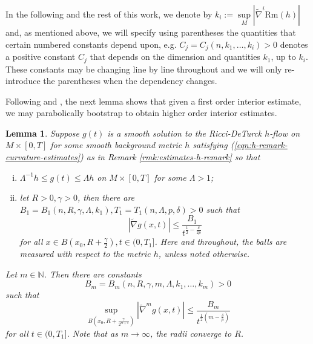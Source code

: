\documentclass[12pt]{amsart}
\theoremstyle{plain}
\theoremstyle{plain}
\newtheorem{lemma}[subsection]{Lemma}
\theoremstyle{definition}
\theoremstyle{remark}
\numberwithin{equation}{subsection}
\newcommand{\hdel}{\tilde{\nabla}}
\begin{document}
In the following and the rest of this work, we denote by $k_i := \sup\limits_M|\hdel^i\text{Rm}(h)|$ and, as mentioned above, we will specify using parentheses the quantities that certain numbered constants depend upon, e.g. $C_j = C_j(n,k_1,\dots,k_i) > 0$ denotes a positive constant $C_j$ that depends on the dimension and quantities $k_1$, up to $k_i$. These constants may be changing line by line throughout and we will only re-introduce the parentheses when the dependency changes.

Following \cite{shi_deforming_1989} and \cite{simon_deformation_2002}, the next lemma shows that given a first order interior estimate, we may parabolically bootstrap to obtain higher order interior estimates.

\begin{lemma}\label{lem:estimates-bootstrap}
    Suppose $g(t)$ is a smooth solution to the Ricci-DeTurck $h$-flow on $M \times [0,T]$ for some smooth background metric $h$ satisfying (\ref{eqn:h-remark-curvature-estimates}) as in Remark \ref{rmk:estimates-h-remark} so that
    \begin{enumerate}[(i)]
        \item $\Lambda^{-1}h \leq g(t) \leq \Lambda h$ on $M\times[0,T]$ for some $\Lambda > 1$;
        \item let $R > 0, \gamma > 0$, then there are $B_1 = B_1(n,R,\gamma,\Lambda,k_1), T_1 = T_1(n,\Lambda,p,\delta) > 0$ such that
        \begin{equation*}
            |\hdel g(x,t)| \leq \frac{B_1}{t^{\frac{1}{2}-\frac{\delta}{2p}}}
        \end{equation*}
        for all $x \in B\left(x_0, R + \frac{\gamma}{2}\right), t \in (0, T_1]$. Here and throughout, the balls are measured with respect to the metric $h$, unless noted otherwise.
    \end{enumerate}
    Let $m \in \mathbb{N}$. Then there are constants 
    \begin{equation*}
        B_m = B_m(n,R,\gamma, m,\Lambda,k_1,\dots,k_m) > 0
    \end{equation*}
    such that 
    \begin{equation}\label{eqn:bootstrap-higher-order-interior-estimate}
        \sup\limits_{B\left(x_0, R + \frac{\gamma}{2^{m+1}}\right)} |\hdel^m g(x,t)| \leq \frac{B_m}{t^{\frac{1}{2}(m-\frac{\delta}{p})}}
    \end{equation}
    for all $t \in (0, T_1]$. Note that as $m \to \infty$, the radii converge to $R$.
\end{lemma}
\end{document}
